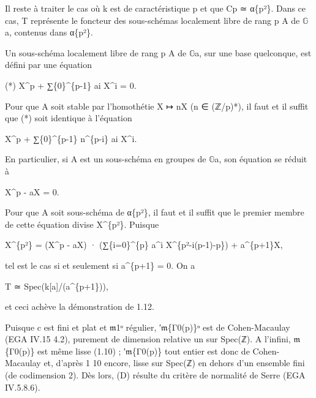 \documentclass[11pt,a4paper]{article}
\begin{document}
Il reste à traiter le cas où k est de caractéristique p et que C\textunderscore{}p ≃ α\textunderscore{}\{p²\}. Dans ce cas, T représente le foncteur des sous-schémas localement libre de rang p A de \ensuremath{\mathbb{G}}\textunderscore{}a, contenus dans α\textunderscore{}\{p²\}.

Un sous-schéma localement libre de rang p A de \ensuremath{\mathbb{G}}\textunderscore{}a, sur une base quelconque, est défini par une équation

(*)        X\textasciicircum{}p + ∑\textunderscore{}\{0\}\textasciicircum{}\{p-1\} a\textunderscore{}i X\textasciicircum{}i = 0.

Pour que A soit stable par l'homothétie X ↦ nX (n ∈ (ℤ/p)*), il faut et il suffit que (*) soit identique à l'équation

X\textasciicircum{}p + ∑\textunderscore{}\{0\}\textasciicircum{}\{p-1\} n\textasciicircum{}\{p-i\} a\textunderscore{}i X\textasciicircum{}i.

En particulier, si A est un sous-schéma en groupes de \ensuremath{\mathbb{G}}\textunderscore{}a, son équation se réduit à

X\textasciicircum{}p - aX = 0.

Pour que A soit sous-schéma de α\textunderscore{}\{p²\}, il faut et il suffit que le premier membre de cette équation divise X\textasciicircum{}\{p²\}. Puisque

X\textasciicircum{}\{p²\} = (X\textasciicircum{}p - aX) · (∑\textunderscore{}\{i=0\}\textasciicircum{}\{p\} a\textasciicircum{}i X\textasciicircum{}\{p²-i(p-1)-p\}) + a\textasciicircum{}\{p+1\}X,

tel est le cas si et seulement si a\textasciicircum{}\{p+1\} = 0. On a

T ≃ Spec(k[a]/(a\textasciicircum{}\{p+1\})),

et ceci achève la démonstration de 1.12.

Puisque c est fini et plat et \ensuremath{\mathfrak{m}}\textunderscore{}1ᵒ régulier, ′\ensuremath{\mathfrak{m}}\textunderscore{}\{Γ\textunderscore{}0(p)\}ᵒ est de Cohen-Macaulay (EGA IV.15 4.2), purement de dimension relative un sur Spec(ℤ). A l'infini, \ensuremath{\mathfrak{m}}\textunderscore{}\{Γ\textunderscore{}0(p)\} est même lisse (1.10) ; ′\ensuremath{\mathfrak{m}}\textunderscore{}\{Γ\textunderscore{}0(p)\} tout entier est donc de Cohen-Macaulay et, d'après 1 10 encore, lisse sur Spec(ℤ) en dehors d'un ensemble fini (de codimension 2). Dès lors, (D) résulte du critère de normalité de Serre (EGA IV.5.8.6).
\end{document}
